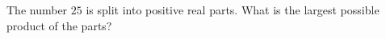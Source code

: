 The number $25$ is split into positive real parts. What is the largest possible product of the parts?
